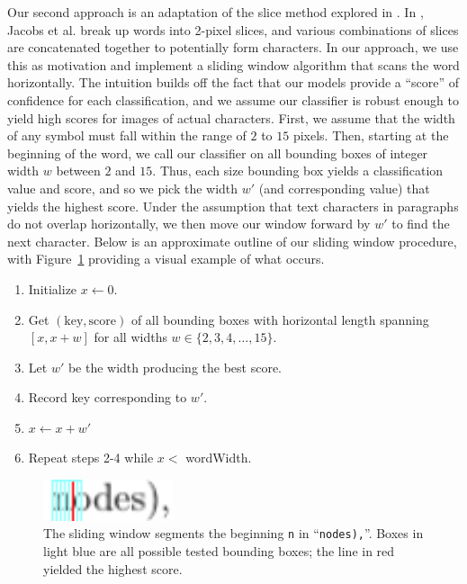 \documentclass[10pt]{IEEEtran}
\begin{document}
Our second approach is an adaptation of the slice method explored in \cite{1}. In \cite{1}, Jacobs et al. break up words into 2-pixel slices, and various combinations of slices are concatenated together to potentially form characters. In our approach, we use this as motivation and implement a sliding window algorithm that scans the word horizontally. The intuition builds off the fact that our models provide a ``score'' of confidence for each classification, and we assume our classifier is robust enough to yield high scores for images of actual characters. First, we assume that the width of any symbol must fall within the range of $2$ to $15$ pixels. Then, starting at the beginning of the word, we call our classifier on all bounding boxes of integer width $w$ between $2$ and $15$. Thus, each size bounding box yields a classification value and score, and so we pick the width $w'$ (and corresponding value) that yields the highest score. Under the assumption that text characters in paragraphs do not overlap horizontally, we then move our window forward by $w'$ to find the next character. Below is an approximate outline of our sliding window procedure, with Figure~\ref{fig:wordWindow1} providing a visual example of what occurs.

\begin{enumerate}
\item Initialize $x \leftarrow 0$.
\item Get $(\text{key},\text{score})$ of all bounding boxes with horizontal length spanning $[x, x+w]$ for all widths $w \in \{2,3,4,\dots,15\}$.
\item Let $w'$ be the width producing the best score.
\item Record key corresponding to $w'$.
\item $x \leftarrow x + w'$
\item Repeat steps 2-4 while $x <$ wordWidth.
\end{enumerate}

\begin{figure}[h]
  \centering
    \includegraphics[width=1.5in]{word1-window.png}
  \caption{The sliding window segments the beginning \texttt{n} in ``\texttt{nodes),}''. Boxes in light blue are all possible tested bounding boxes; the line in red yielded the highest score.}
  \label{fig:wordWindow1}
\end{figure}
\end{document}
